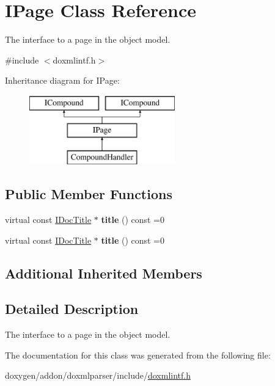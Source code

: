\hypertarget{class_i_page}{}\section{I\+Page Class Reference}
\label{class_i_page}


The interface to a page in the object model.  




{\ttfamily \#include $<$doxmlintf.\+h$>$}

Inheritance diagram for I\+Page\+:\begin{figure}[H]
\begin{center}
\leavevmode
\includegraphics[height=3.000000cm]{class_i_page}
\end{center}
\end{figure}
\subsection*{Public Member Functions}
\begin{DoxyCompactItemize}
\item 
\mbox{\label{class_i_page_a90e034a5ed6b0a064328a5dcf608fcc9}} 
virtual const \mbox{\hyperlink{class_i_doc_title}{I\+Doc\+Title}} $\ast$ {\bfseries title} () const =0
\item 
\mbox{\label{class_i_page_a90e034a5ed6b0a064328a5dcf608fcc9}} 
virtual const \mbox{\hyperlink{class_i_doc_title}{I\+Doc\+Title}} $\ast$ {\bfseries title} () const =0
\end{DoxyCompactItemize}
\subsection*{Additional Inherited Members}


\subsection{Detailed Description}
The interface to a page in the object model. 

The documentation for this class was generated from the following file\+:\begin{DoxyCompactItemize}
\item 
doxygen/addon/doxmlparser/include/\mbox{\hyperlink{include_2doxmlintf_8h}{doxmlintf.\+h}}\end{DoxyCompactItemize}
